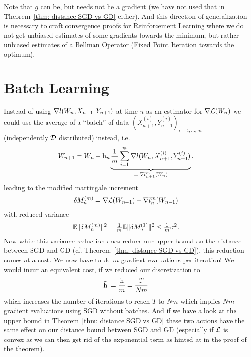 Note that \(g\) can be, but needs not be a gradient (we have not used that in
Theorem~\ref{thm: distance SGD vs GD} either). And this direction of
generalization is necessary to craft convergence proofs for Reinforcement
Learning where we do not get unbiased estimates of some gradients towards the
minimum, but rather unbiased estimates of a Bellman Operator (Fixed Point 
Iteration towards the optimum).

\section{Batch Learning}

Instead of using \(\nabla l(W_n, X_{n+1}, Y_{n+1})\) at time \(n\) as an
estimator for \(\nabla\mathcal{L}(W_n)\) we could use the average of a
``batch'' of data \((X^{(i)}_{n+1}, Y^{(i)}_{n+1})_{i=1,\dots,m}\) (independently
\(\mathcal{D}\) distributed) instead, i.e.
\begin{align*}
	W_{n+1} = W_n
	-\text{h}_n \underbrace{\frac1{m}\sum_{i=1}^m\nabla l(W_n,X^{(i)}_{n+1}, Y^{(i)}_{n+1})}_{
		=:\nabla l_{n+1}^m(W_n)
	}.
\end{align*}
leading to the modified martingale increment
\begin{align*}
	\delta M_n^{(m)}
	= \nabla\mathcal{L}(W_{n-1})
	- \nabla l_n^m(W_{n-1})
\end{align*}
with reduced variance
\begin{align*}
	\mathbb{E}\|\delta M_n^{(m)}\|^2 = \tfrac1m\mathbb{E}\|\delta M_n^{(1)}\|^2 \le \tfrac1m \sigma^2.
\end{align*}
Now while this variance reduction does reduce our upper bound on the distance
between SGD and GD (cf. Theorem~\ref{thm: distance SGD vs GD}), this reduction
comes at a cost: We now have to do \(m\) gradient evaluations per iteration!
We would incur an equivalent cost, if we reduced our discretization to
\begin{align*}
	\tilde{\text{h}}:=\frac{\text{h}}{m}=\frac{T}{Nm}
\end{align*}
which increases the number of iterations to reach \(T\) to \(Nm\) which implies
\(Nm\) gradient evaluations using SGD without batches. And if we have a look
at the upper bound in Theorem~\ref{thm: distance SGD vs GD} these two actions
have the same effect on our distance bound between SGD and GD (especially if
\(\mathcal{L}\) is convex as we can then get rid of the exponential term as hinted
at in the proof of the theorem).

